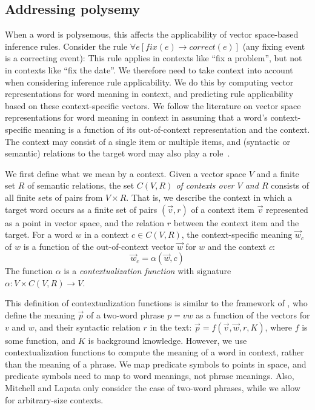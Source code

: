 \subsection*{Addressing polysemy}

When a word is polysemous, this affects the applicability of vector
space-based inference rules. Consider the rule $\forall e[fix(e) \to
correct(e)]$ (any fixing event is a correcting event): This rule
applies in contexts like ``fix a problem'', but not in contexts like
``fix the date''. We therefore need to take context into account when
considering inference rule applicability. We do this by computing
vector representations for word meaning in context, and predicting
rule applicability based on these context-specific vectors. We follow
the literature on vector space representations for word meaning in context
\citep{erk:emnlp2008,thater:acl2010,reisinger:naacl2010,dinu:emnlp2010,vandecruys:emnlp2011}
in assuming that a word's context-specific meaning is a function of its
out-of-context representation and the context. The context may consist
of a single item or multiple items, and (syntactic or semantic) relations to the
target word may also play a
role~\citep{erk:emnlp2008,thater:acl2010,vandecruys:emnlp2011}. 

We first define what we mean by a context. Given a vector space $V$ and a finite
set $R$ of semantic relations, the set \textit{$C(V, R)$ of contexts over $V$
and $R$} consists of all finite sets of pairs from $V \times R$.  That is, we
describe the context in which a target word occurs as a finite set of pairs
$(\vec v, r)$ of a context item $\vec v$ represented as a point in vector space,
and the relation $r$ between the context item and the target.
For a word $w$ in a context $c \in C(V, R)$, the context-specific meaning $\vec
w_c$ of $w$ is a function of the out-of-context vector $\vec w$ for $w$ and the
context $c$:
\[\vec w_c = \alpha(\vec w, c)\] The function $\alpha$ is a
\emph{contextualization function} with signature $\alpha: V \times C(V, R) \to
V$.

This definition of contextualization functions is similar to the framework of
\citet{mitchell:acl2008}, who define the meaning $\vec p$ of a two-word phrase
$p = vw$ as a function of the vectors for $v$ and $w$, and their syntactic
relation $r$ in the text: $\vec p = f(\vec v, \vec w, r, K)$,  where $f$ is some
function, and $K$ is background knowledge. However, we use contextualization
functions to compute the meaning of a word in context, rather than the meaning
of a phrase. We map predicate symbols to points in space, and predicate symbols
need to map to word meanings, not phrase meanings. Also, Mitchell and Lapata
only consider the case of two-word phrases, while we allow for arbitrary-size
contexts.


